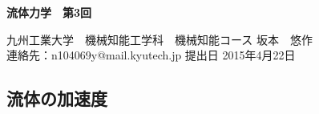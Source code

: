 \documentclass[a4j,twoside,openright,11pt]{jsarticle}
\begin{document}
\begin{screen}
\huge
\begin{center}
{\bf 流体力学　第3回}\\
\end{center}

\normalsize
\begin{flushright}
九州工業大学　機械知能工学科　機械知能コース  坂本　悠作\\連絡先：n104069y@mail.kyutech.jp \hspace{0.2in}提出日 2015年4月22日
\end{flushright}
\end{screen}

\setcounter{section}{2} 
\setcounter{subsection}{2}
\subsection{流体の加速度}
\end{document}
